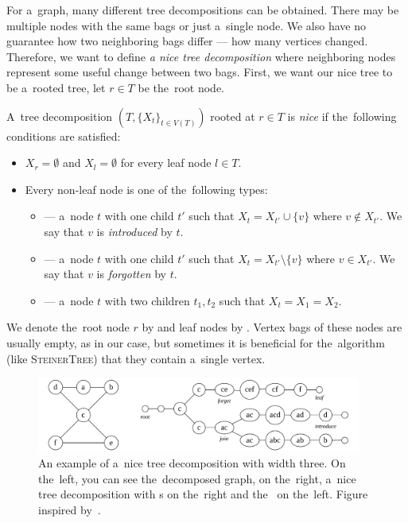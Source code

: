 For a~graph, many different tree decompositions can be obtained.
There may be multiple nodes with the same bags or just a~single node.
We also have no guarantee how two neighboring bags differ --- how many vertices changed.
Therefore, we want to define \emph{a nice tree decomposition} where neighboring nodes
represent some useful change between two bags.
First, we want our nice tree to be a~rooted tree,
let \( r \in T \) be the~root node.
%
\begin{definition}
	A~tree decomposition \newline
	\( (T, {\{X_t\}}_{t \in V ( T )}) \) rooted at \( r \in T \)
	is \emph{nice} if the~following conditions are satisfied:
	\begin{itemize}
		\item \( X_r = \emptyset \) and \( X_l = \emptyset \) for every leaf node \( l \in T \).
		\item Every non-leaf node is one of the~following types:
		      \begin{itemize}
			      \item \IntroduceVertexNode{} --- a~node \( t \) with one child \( t' \)
			            such that \( X_t = X_{t'} \cup \{v\} \) where \( v \not\in X_{t'} \).
			            We say that \( v \) is \emph{introduced} by \( t \).
			      \item \ForgetVertexNode{} --- a~node \( t \) with one child \( t' \)
			            such that \( X_t = X_{t'} \setminus \{v\} \) where \( v \in X_{t'} \).
			            We say that \( v \) is \emph{forgotten} by \( t \).
			      \item \JoinNode{} --- a~node \( t \) with two children \( t_1, t_2 \)
			            such that \( X_t = X_1 = X_2 \).
		      \end{itemize}
	\end{itemize}
	We denote the~root node \( r \) by \RootNode{} and leaf nodes by \LeafNode{}.
	Vertex bags of these nodes are usually empty, as in our case,
	but sometimes it is beneficial
	for the~algorithm (like \textsc{SteinerTree}) that they contain a~single vertex.
\end{definition}
%
\begin{figure}[ht]
	\begin{center}
		\includegraphics[width=0.95\textwidth]{./assets/nice_tree_decomposition}
	\end{center}
	\caption[Nice tree decomposition]{
		An example of a~nice tree decomposition with width three.
		On the~left, you can see the~decomposed graph,
		on the~right, a~nice tree decomposition
		with \LeafNode{}s on the~right and the~\RootNode{} on the~left.
		Figure inspired by~\cite{nice_tree_decomposition_img}.
	}%
	\label{fig:nice_tree_decomposition}
\end{figure}

